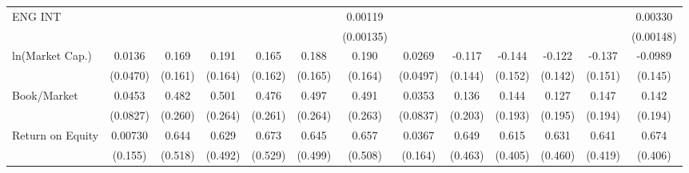 {\begin{tabular}{l*{12}{c}}
ENG INT             &                     &                     &                     &                     &                     &     0.00119         &                     &                     &                     &                     &                     &     0.00330\sym{**} \\
                    &                     &                     &                     &                     &                     &   (0.00135)         &                     &                     &                     &                     &                     &   (0.00148)         \\
ln(Market Cap.)     &      0.0136         &       0.169         &       0.191         &       0.165         &       0.188         &       0.190         &      0.0269         &      -0.117         &      -0.144         &      -0.122         &      -0.137         &     -0.0989         \\
                    &    (0.0470)         &     (0.161)         &     (0.164)         &     (0.162)         &     (0.165)         &     (0.164)         &    (0.0497)         &     (0.144)         &     (0.152)         &     (0.142)         &     (0.151)         &     (0.145)         \\
Book/Market         &      0.0453         &       0.482\sym{*}  &       0.501\sym{*}  &       0.476\sym{*}  &       0.497\sym{*}  &       0.491\sym{*}  &      0.0353         &       0.136         &       0.144         &       0.127         &       0.147         &       0.142         \\
                    &    (0.0827)         &     (0.260)         &     (0.264)         &     (0.261)         &     (0.264)         &     (0.263)         &    (0.0837)         &     (0.203)         &     (0.193)         &     (0.195)         &     (0.194)         &     (0.194)         \\
Return on Equity    &     0.00730         &       0.644         &       0.629         &       0.673         &       0.645         &       0.657         &      0.0367         &       0.649         &       0.615         &       0.631         &       0.641         &       0.674         \\
                    &     (0.155)         &     (0.518)         &     (0.492)         &     (0.529)         &     (0.499)         &     (0.508)         &     (0.164)         &     (0.463)         &     (0.405)         &     (0.460)         &     (0.419)         &     (0.406)         \\

\end{tabular}}
